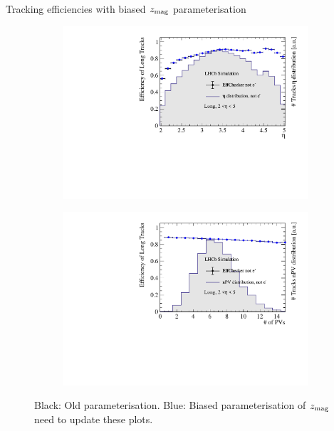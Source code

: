 \documentclass[xcolor={dvipsnames}]{beamer}
\begin{document}
\begin{frame}{Tracking efficiencies with biased $z_{\rm mag}$ parameterisation}
\begin{figure}[htb]
\begin{subfigure}{0.45\textwidth}
      \includegraphics[width=1\textwidth]{Plots/TrackEfficiency_eta_improved_MC_parameterisation.pdf}
    \end{subfigure}%
    \begin{subfigure}{0.45\textwidth}
      \includegraphics[width=1\textwidth]{Plots/TrackEfficiency_nPV_improved_MC_parameterisation.pdf}
    \end{subfigure}
    \vspace{-0.2cm}
    \caption*{Black: Old parameterisation. {\color{blue}Blue: Biased parameterisation of $z_{\rm mag}$} {\color{red}need to update these plots}.}
  \end{figure}
\end{frame}
\end{document}
